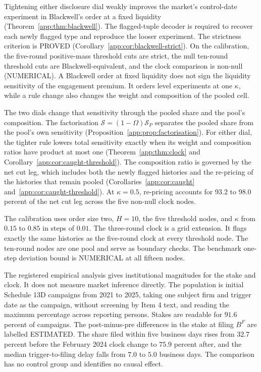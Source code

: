 \documentclass[11pt]{article}
\begin{document}
Tightening either disclosure dial weakly improves the market's control-date experiment in
Blackwell's order at a fixed liquidity (Theorem~\ref{app:thm:blackwell}). The flagged-tuple decoder
is required to recover each newly flagged type and reproduce the looser experiment. The strictness
criterion is PROVED (Corollary~\ref{app:cor:blackwell-strict}). On the calibration, the five-round
positive-mass threshold cuts are strict, the null ten-round threshold cuts are
Blackwell-equivalent, and the clock comparison is non-null (NUMERICAL). A Blackwell order at fixed
liquidity does not sign the liquidity sensitivity of the engagement premium. It orders level
experiments at one $\kappa$, while a rule change also changes the weight and composition of the
pooled cell.

The two dials change that sensitivity through the pooled share and the pool's composition. The
factorisation $\mathcal S=(1-\Omega)\mathcal S_P$ separates the pooled share from the pool's own
sensitivity (Proposition~\ref{app:prop:factorisation}). For either dial, the tighter rule lowers total
sensitivity exactly when its weight and composition ratios have product at most one
(Theorem~\ref{app:thm:clock} and Corollary~\ref{app:cor:caught-threshold}). The composition ratio is
governed by the net cut leg, which includes both the newly flagged histories and the re-pricing of
the histories that remain pooled (Corollaries~\ref{app:cor:caught}
and~\ref{app:cor:caught-threshold}). At $\kappa=0.5$, re-pricing accounts for 93.2 to 98.0 percent of
the net cut leg across the five non-null clock nodes.

The calibration uses order size two, $H=10$, the five threshold nodes, and $\kappa$ from $0.15$ to
$0.85$ in steps of $0.01$. The three-round clock is a grid extension. It flags exactly the same
histories as the five-round clock at every threshold node. The ten-round nodes are one pool and
serve as boundary checks. The benchmark one-step deviation bound is NUMERICAL at all fifteen nodes.

The registered empirical analysis gives institutional magnitudes for the stake and clock. It does
not measure market inference directly. The population is initial Schedule 13D campaigns from 2021
to 2025, taking one subject firm and trigger date as the campaign, without screening by Item 4 text,
and reading the maximum percentage across reporting persons. Stakes are readable for $91.6$ percent
of campaigns. The post-minus-pre differences in the stake at filing $B^F$ are labelled ESTIMATED.
The share filed within five business days rises from $32.7$ percent before the February 2024 clock
change to $75.9$ percent after, and the median trigger-to-filing delay falls from $7.0$ to $5.0$
business days. The comparison has no control group and identifies no causal effect.
\end{document}
